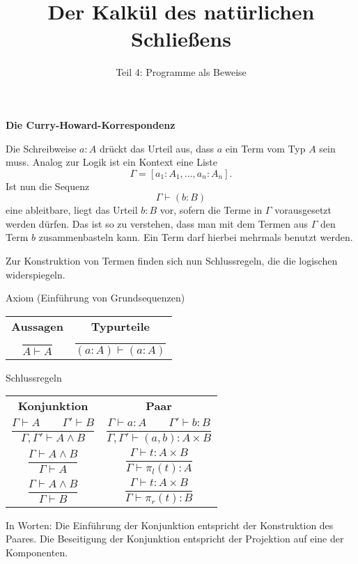\documentclass[8pt]{beamer}
\title{Der Kalkül des natürlichen Schließens}
\subtitle{Teil 4: Programme als Beweise}
\date{}
\newcommand{\strong}[1]{\textsf{\textbf{#1}}}
\newcommand{\centerheadline}[1]{%
  \begin{center}\strong{#1}\end{center}}
\newcommand{\parspace}{\vspace{0.8em}}
\begin{document}
\begin{frame}
\maketitle
\end{frame}

\begin{frame}
\centerheadline{Die Curry-Howard-Korrespondenz}
\end{frame}

\begin{frame}
Die Schreibweise $a\colon A$ drückt das Urteil aus, dass $a$ ein Term
vom Typ $A$ sein muss.\pause{} Analog zur Logik ist ein Kontext eine Liste
\[\Gamma = [a_1\colon A_1,\ldots,a_n\colon A_n].\]
Ist nun die Sequenz
\[\Gamma\vdash (b\colon B)\]
eine ableitbare, liegt das Urteil $b\colon B$ vor, sofern die Terme
in $\Gamma$ vorausgesetzt werden dürfen. Das ist so zu verstehen,
dass man mit dem Termen aus $\Gamma$ den Term $b$ zusammenbasteln kann.
Ein Term darf hierbei mehrmals benutzt werden.\pause
\end{frame}

\begin{frame}
Zur Konstruktion von Termen finden sich nun Schlussregeln, die die
logischen widerspiegeln.\pause

\begin{block}{Axiom (Einführung von Grundsequenzen)}
\begin{center}
\begin{tabular}{c@{\qquad\qquad}c}
\strong{Aussagen} & \strong{Typurteile}\\[10pt]
$\dfrac{}{A\vdash A}$ & $\dfrac{}{(a\colon A)\vdash (a\colon A)}$
\end{tabular}
\end{center}
\end{block}
\end{frame}

\begin{frame}
\begin{block}{Schlussregeln}
\begin{center}
\begin{tabular}{c@{\qquad\qquad}c}
\strong{Konjunktion}
& \strong{Paar}\\[10pt]
$\dfrac{\Gamma\vdash A\qquad\Gamma'\vdash B}{\Gamma,\Gamma'\vdash A\land B}$
&
$\dfrac{\Gamma\vdash a\colon A\qquad\Gamma'\vdash b\colon B}{\Gamma,\Gamma'\vdash (a,b)\colon A\times B}$\\[18pt]
$\dfrac{\Gamma\vdash A\land B}{\Gamma\vdash A}$
& $\dfrac{\Gamma\vdash t\colon A\times B}{\Gamma\vdash \pi_l(t)\colon A}$\\[18pt]
$\dfrac{\Gamma\vdash A\land B}{\Gamma\vdash B}$
& $\dfrac{\Gamma\vdash t\colon A\times B}{\Gamma\vdash \pi_r(t)\colon B}$
\end{tabular}
\end{center}
\end{block}\pause

\parspace
In Worten: Die Einführung der Konjunktion entspricht der Konstruktion
des Paares. Die Beseitigung der Konjunktion entspricht der Projektion
auf eine der Komponenten.
\end{frame}
\end{document}
